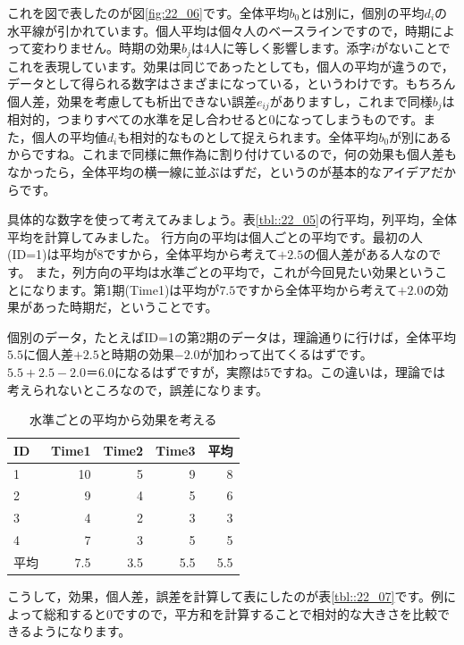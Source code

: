 \documentclass{ltjbook}
\begin{document}
これを図で表したのが図\ref{fig:22_06}です。全体平均$b_0$とは別に，個別の平均$d_i$の水平線が引かれています。個人平均は個々人のベースラインですので，時期によって変わりません。時期の効果$b_j$は4人に等しく影響します。添字$i$がないことでこれを表現しています。効果は同じであったとしても，個人の平均が違うので，データとして得られる数字はさまざまになっている，というわけです。もちろん個人差，効果を考慮しても析出できない誤差$e_{ij}$がありますし，これまで同様$b_{j}$は相対的，つまりすべての水準を足し合わせると$0$になってしまうものです。また，個人の平均値$d_i$も相対的なものとして捉えられます。全体平均$b_0$が別にあるからですね。これまで同様に無作為に割り付けているので，何の効果も個人差もなかったら，全体平均の横一線に並ぶはずだ，というのが基本的なアイデアだからです。

具体的な数字を使って考えてみましょう。表\ref{tbl::22_05}の行平均，列平均，全体平均を計算してみました。
行方向の平均は個人ごとの平均です。最初の人(ID=1)は平均が$8$ですから，全体平均から考えて$+2.5$の個人差がある人なのです。
また，列方向の平均は水準ごとの平均で，これが今回見たい効果ということになります。第1期(Time1)は平均が$7.5$ですから全体平均から考えて$+2.0$の効果があった時期だ，ということです。

個別のデータ，たとえばID=1の第2期のデータは，理論通りに行けば，全体平均$5.5$に個人差$+2.5$と時期の効果$-2.0$が加わって出てくるはずです。$5.5+2.5-2.0＝6.0$になるはずですが，実際は$5$ですね。この違いは，理論では考えられないところなので，誤差になります。
\begin{table}[ht]
	\centering
	\caption{水準ごとの平均から効果を考える}
	\begin{tabular}{lrrr|r}
		\hline
		ID & Time1 & Time2 & Time3 & 平均  \\
		\hline
		1  & 10    & 5     & 9     & 8   \\
		2  & 9     & 4     & 5     & 6   \\
		3  & 4     & 2     & 3     & 3   \\
		4  & 7     & 3     & 5     & 5   \\
		\hline
		平均 & 7.5   & 3.5   & 5.5   & 5.5 \\\hline
	\end{tabular}
	\label{tbl::22_06}
\end{table}
こうして，効果，個人差，誤差を計算して表にしたのが表\ref{tbl::22_07}です。例によって総和すると0ですので，平方和を計算することで相対的な大きさを比較できるようになります。
\end{document}
